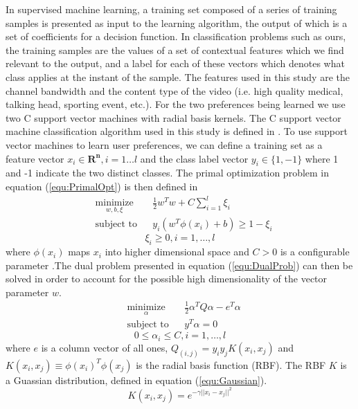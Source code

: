 \documentclass[a4paper,12pt]{article}
\begin{document}
In supervised machine learning, a training set composed of a series of training samples is presented as input to the learning algorithm, the output of which is a set of coefficients for a decision function. In classification problems such as ours, the training samples are the values of a set of contextual features which we find relevant to the output, and a label for each of these vectors which denotes what class applies at the instant of the sample. The features used in this study are the channel bandwidth and the content type of the video (i.e. high quality medical, talking head, sporting event, etc.). For the two preferences being learned we use two C support vector machines with radial basis kernels. The C support vector machine classification algorithm used in this study is defined in \cite{LibSVM}. To use support vector machines to learn user preferences, we can define a training set as a feature vector $x_i \in \mathbf{R^n}  ,i=1\ldots{l}$ and the class label vector $y_i \in \lbrace 1,-1 \rbrace $ where 1 and -1 indicate the two distinct classes. The primal optimization problem in equation (\ref{equ:PrimalOpt}) is then defined in \cite{LibSVM}
\begin{equation}
\begin{aligned}
\label{equ:PrimalOpt}
& \underset{w,b,\xi}{\text{minimize}}
& & \frac{1}{2}w^Tw+C\sum_{i=1}^{l} \xi_i \\
& \text{subject to}
& &  y_i(w^T\phi(x_i) + b) \ge 1 - \xi_i
\end{aligned}
\end{equation}
\[ \xi_i \ge 0, i = 1,\ldots ,l \]
where $\phi (x_i)$ maps $x_i$ into higher dimensional space and $C > 0$ is a configurable parameter \cite{LibSVM}.The dual problem presented in equation (\ref{equ:DualProb}) can then be solved in order to account for the possible high dimensionality of the vector parameter $w$.
\begin{equation}
\begin{aligned}
\label{equ:DualProb}
& \underset{\alpha}{\text{minimize}}
& & \frac{1}{2}\alpha^TQ\alpha-e^T\alpha \\
& \text{subject to}
& &  y^T\alpha = 0
\end{aligned}
\end{equation}
\[ 0 \le \alpha_i \le C, i = 1,\ldots ,l \]
where $e$ is a column vector of all ones, $Q_(i,j)=y_i y_j K(x_i,x_j)$ and $K(x_i,x_j ) \equiv \phi (x_i )^T \phi (x_j)$ is the radial basis function (RBF). The RBF $K$ is a Guassian distribution, defined in equation (\ref{equ:Gaussian}).
\begin{equation}
\label{equ:Gaussian}
K(x_i, x_j) = e^{-\gamma ||x_i - x_j||^{2}}
\end{equation}
\end{document}
